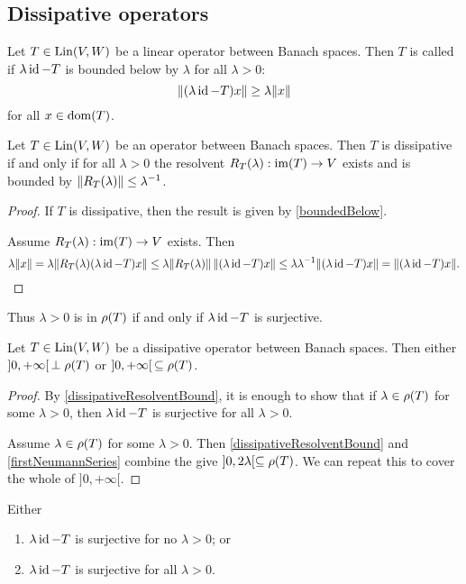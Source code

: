 \subsection{Dissipative operators}
\begin{definition}
Let $T\in \operatorname{Lin}(V, W)$ be a linear operator between Banach spaces. Then $T$ is called  if $\lambda\operatorname{id}-T$ is bounded below by $\lambda$ for all $\lambda>0$:
\[ \lVert(\lambda\operatorname{id}-T)x\rVert \geq \lambda\lVert x\rVert \]
for all $x\in\operatorname{dom}(T)$.
\end{definition}

\begin{lemma} \label{dissipativeResolventBound}
Let $T\in \operatorname{Lin}(V, W)$ be an operator between Banach spaces. Then $T$ is dissipative \textup{if and only if} for all $\lambda>0$ the resolvent $R_T(\lambda): \operatorname{im}(T)\to V$ exists and is bounded by $\lVert R_T(\lambda)\rVert \leq \lambda^{-1}$.
\end{lemma}
\begin{proof}
If $T$ is dissipative, then the result is given by \ref{boundedBelow}.

Assume $R_T(\lambda): \operatorname{im}(T)\to V$ exists. Then
\[ \lambda\lVert x\rVert = \lambda\lVert R_T(\lambda)(\lambda\operatorname{id}-T)x\rVert \leq \lambda \lVert R_T(\lambda)\rVert\,\lVert(\lambda\operatorname{id}-T)x\rVert \leq \lambda\lambda^{-1}\lVert(\lambda\operatorname{id}-T)x\rVert = \lVert(\lambda\operatorname{id}-T)x\rVert. \]
\end{proof}

Thus $\lambda>0$ is in $\rho(T)$ if and only if $\lambda\operatorname{id} - T$ is surjective.


\begin{proposition} \label{spectrumDissipativeOperator}
Let $T\in \operatorname{Lin}(V, W)$ be a dissipative operator between Banach spaces. Then either $]0,+\infty[\,\perp \rho(T)$ or $]0,+\infty[\,\subseteq \rho(T)$.
\end{proposition}
\begin{proof}
By \ref{dissipativeResolventBound}, it is enough to show that if $\lambda\in\rho(T)$ for some $\lambda >0$, then $\lambda\operatorname{id} - T$ is surjective for all $\lambda>0$.

Assume $\lambda\in\rho(T)$ for some $\lambda >0$. Then \ref{dissipativeResolventBound} and \ref{firstNeumannSeries} combine the give $]0, 2\lambda[ \subseteq \rho(T)$. We can repeat this to cover the whole of $]0,+\infty[$.
\end{proof}
\begin{corollary} \label{rangeDisjunctionDissipativeOperator}
Either
\begin{enumerate}
\item $\lambda\operatorname{id}-T$ is surjective for no $\lambda > 0$; or
\item $\lambda\operatorname{id}-T$ is surjective for all $\lambda > 0$.
\end{enumerate}
\end{corollary}

